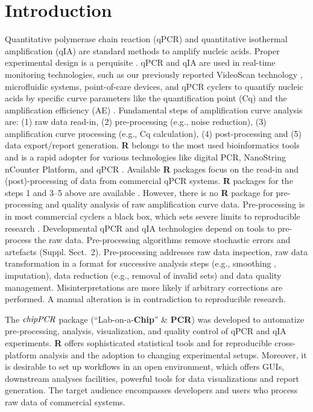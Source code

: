 \documentclass{bioinfo}
\begin{document}
\section{Introduction}

Quantitative polymerase chain reaction (qPCR) and quantitative isothermal 
amplification (qIA) are standard methods to amplify nucleic acids. Proper 
experimental design is a perquisite \citep{cobb_1994}. qPCR and qIA are used in 
real-time monitoring technologies, such as our previously reported VideoScan 
technology \citep{roediger_highly_2013,spiess_impact_2014}, microfluidic systems, point-of-care 
devices, and qPCR cyclers to quantify nucleic acids by specific curve parameters like the 
quantification point (Cq) and the amplification efficiency (AE) 
\citep{pabinger_2014,rodiger_nucleic_2014}. Fundamental steps of amplification 
curve analysis are: (1) raw data read-in, (2) pre-processing (e.g., noise 
reduction), (3) amplification curve processing 
(e.g., Cq calculation), (4) post-processing and (5) data 
export/report generation. \textbf{R} belongs to the most used bioinformatics	
tools and is a rapid adopter for various technologies like digital PCR, 
NanoString nCounter Platform, and qPCR \citep{waggott_2012,pabinger_2014}. 
Available \textbf{R} packages focus on the read-in and (post)-processing of data 
from commercial qPCR systems. \textbf{R} packages for the steps 1 and 3--5 above 
are available \citep{perkins_2012,gehlenborg_2013,mccall_2014,pabinger_2014}. 
However, there is no \textbf{R} package for pre-processing and quality analysis 
of raw amplification curve data. Pre-processing is in most commercial cyclers a 
black box, which sets severe limits to reproducible research 
\citep{Leeper_2014}. Developmental qPCR and qIA technologies depend on tools to 
pre-process the raw data. Pre-processing algorithms remove stochastic errors and 
artefacts (Suppl. Sect.~2). Pre-processing addresses raw data inspection, raw 
data transformation in a format for successive analysis steps (e.g., smoothing 
\citep{spiess_impact_2014}, imputation), data reduction (e.g., removal of 
invalid sets) and data quality management. Misinterpretations are more likely if 
arbitrary corrections are performed. A manual alteration is in contradiction to 
reproducible research.

The $\emph{chipPCR}$ package (``Lab-on-a-\textbf{Chip}'' \& \textbf{PCR}) was 
developed to automatize pre-processing, analysis, visualization, and quality 
control of qPCR and qIA experiments. \textbf{R} offers sophisticated statistical 
tools and for reproducible cross-platform analysis and the adoption to changing 
experimental setups. Moreover, it is desirable to set up workflows in an open 
environment, which offers GUIs, downstream analyses facilities, powerful tools 
for data visualizations and report generation. The target audience encompasses 
developers and users who process raw data of commercial systems.
\end{document}
